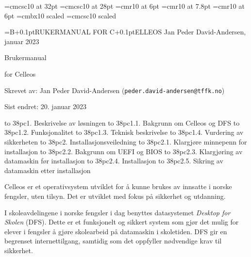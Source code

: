 



\font\ftitteltop=cmcsc10 at 32pt
\font\ftittelbottom=cmcsc10 at 28pt
\font\ftopptekst=cmr10 at 6pt
\font\ftopptekststor=cmr10 at 7.8pt
\font\fforfatter=cmr10 at 6pt
\font\fs=cmbx10 scaled
\font\fss=cmcsc10 scaled

\headline={\ftopptekststor B\kern+0.1pt{\ftopptekst RUKERMANUAL FOR } C\kern+0.1pt{\ftopptekst ELLEOS \hfill Jan Peder David-Andersen, januar 2023}}

\topglue 6pc
\centerline{\ftitteltop Brukermanual}
\vskip 10pt
\centerline{\ftittelbottom for Celleos}
\vskip 8pc

\noindent Skrevet av: Jan Peder David-Andersen ({\tt peder.david-andersen@tffk.no})

\noindent Sist endret: 20. januar 2023

\vskip 3pc
\def\tocwidth{38pc}


\hbox to \tocwidth{1. Beskrivelse av l\o sningen }
\smallskip
\hbox to \tocwidth{1.1. Bakgrunn om Celleos og DFS }
\hbox to \tocwidth{1.2. Funksjonalitet }
\hbox to \tocwidth{1.3. Teknisk beskrivelse }
\hbox to \tocwidth{1.4. Vurdering av sikkerheten }
\medskip
\hbox to \tocwidth{2. Installasjonsveiledning }
\smallskip
\hbox to \tocwidth{2.1. Klargj\o re minnepenn for installasjon }
\hbox to \tocwidth{2.2. Bakgrunn om UEFI og BIOS }
\hbox to \tocwidth{2.3. Klargj\o ring av datamaskin f\o r installasjon }
\hbox to \tocwidth{2.4. Installasjon }
\hbox to \tocwidth{2.5. Sikring av datamaskin etter installasjon }

\vfill\eject

\topglue 1pc

Celleos er et operativsystem utviklet for \aa{} kunne brukes av innsatte i norske fengsler, uten tilsyn. Det er utviklet med fokus p\aa{} sikkerhet og utdanning.



I skoleavdelingene i norske fengsler i dag benyttes datasystemet {\it Desktop for Skolen} (DFS). Dette er et funksjonelt og sikkert system som gj\o r det mulig for elever i fengsler \aa{} gj\o re skolearbeid p\aa{} datamaskin i skoletiden. DFS gir en begrenset internettilgang, samtidig som det oppfyller n\o dvendige krav til sikkerhet.

